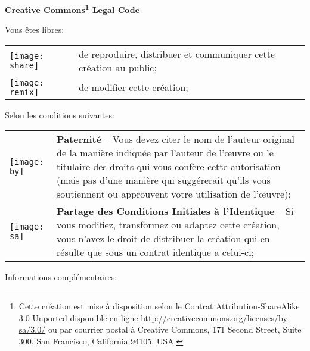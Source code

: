 \begin{center} \textbf{\LARGE{Creative Commons\footnote{
Cette création est mise à disposition selon le Contrat Attribution-ShareAlike 3.0 Unported disponible en ligne \url{http://creativecommons.org/licenses/by-sa/3.0/} ou par courrier postal à Creative Commons, 171 Second Street, Suite 300, San Francisco, California 94105, USA.} Legal Code}} \end{center}
\vspace{1cm}

\large Vous êtes libres:
\normalsize

\begin{center}
  \begin{tabular}{p{1cm} p{12cm}}
    \texttt{[image: share]} & de reproduire, distribuer et communiquer cette création au public;\\
    \texttt{[image: remix]} & de modifier cette création;\\
  \end{tabular}
\end{center}

\large Selon les conditions suivantes:
\normalsize

\begin{center}
  \begin{tabular}{p{1cm} p{12cm}}
    \texttt{[image: by]} & \textbf{Paternité} -- Vous devez citer le nom de l'auteur original
    de la manière indiquée par l'auteur de l'œuvre ou le titulaire des
    droits qui vous confère cette autorisation (mais pas d'une manière
    qui suggérerait qu'ils vous soutiennent ou approuvent votre
    utilisation de l'œuvre);\\
    \texttt{[image: sa]} & \textbf{Partage des Conditions Initiales à l'Identique} --  Si vous
    modifiez, transformez ou adaptez cette création, vous n'avez le
    droit de distribuer la création qui en résulte que sous un contrat
    identique a celui-ci;\\
  \end{tabular}
\end{center}

\large Informations complémentaires:
\normalsize

